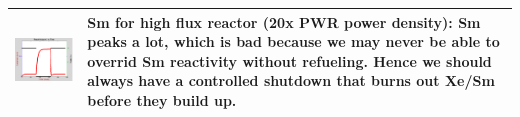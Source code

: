 \documentclass{school-22.211-notes}
\begin{document}
\begin{enumerate}
\begin{table}
\begin{tabular}{|p{}|p{}|}
\begin{minipage}[b]{0.5\textwidth}
      \includegraphics[width=3in]{images/dfs/Pm-Sm-3.png}
    \end{minipage}
    &  
    \begin{minipage}[b]{0.5\textwidth}    
      Sm for high flux reactor (20x PWR power density): Sm peaks a lot, which is bad because we may never be able to overrid Sm reactivity without refueling. Hence we should always have a controlled shutdown that burns out Xe/Sm before they build up. 
    \end{minipage} \\ \hline
  \end{tabular}
\end{table}
\end{enumerate}
\end{document}
